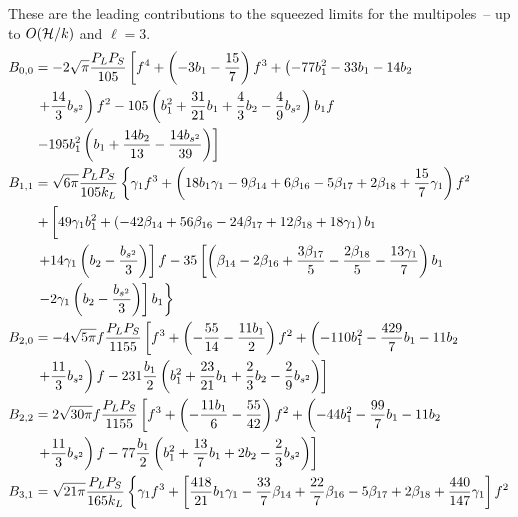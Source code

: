 These are the leading contributions to the squeezed limits for the multipoles~-- up to $O(\mathcal{H}/k)$ and \(\ell = 3\).
\begin{align}
%
B_{0,0} &= -2 \sqrt{\pi} \frac{P_L P_S}{105} \left[f^{4}+\left(-3 b_{1}-\frac{15}{7}\right) f^{3}+\left(-77 b_{1}^{2}-33 b_{1}-14 b_{2} \right. \right. \nonumber \\
&\left. \left. + \frac{14}{3} b_{s^2}\right) f^{2} -105 \left( b_{1}^{2} + \frac{31}{21} b_{1}+\frac{4}{3} b_{2} -\frac{4}{9} b_{s^2}\right) b_{1} f \right. \nonumber \\
&\left. - 195 b_{1}^{2}\left(b_{1}+\frac{14 b_{2}}{13}-\frac{14 b_{s^2}}{39}\right)\right]\\
%
%
%
B_{1,1} &= \sqrt{6 \pi} \frac{P_L P_S}{105 k_{L}} \left\{ \gamma_1 f^{3}+\left(18 b_{1} \gamma_1-9 \beta_{14}+6 \beta_{16}-5 \beta_{17}+2 \beta_{18}+\frac{15}{7} \gamma_1\right) f^{2}\right. \nonumber \\
&\left. +\left[ \vphantom{\frac{\gamma^2}{3}} 49 \gamma_1 b_{1}^{2}+\left(-42 \beta_{14} +56 \beta_{16}-24 \beta_{17}+12 \beta_{18}+18 \gamma_1\right) b_{1} \right. \right. \nonumber \\
&\left. \left. + 14 \gamma_1\left(b_{2}-\frac{b_{s^2}}{3}\right)\right] f -35\left[\left(\beta_{14}-2 \beta_{16}+\frac{3 \beta_{17}}{5}-\frac{2 \beta_{18}}{5}-\frac{13 \gamma_1}{7}\right) b_{1} \right. \right. \nonumber \\
&\left. \left. - 2 \gamma_1\left(b_{2}-\frac{b_{s^2}}{3}\right)  \right] b_{1}\right\} \\
%
%
%
B_{2,0} &= - 4 \sqrt{5 \pi}  f \frac{P_L P_S}{1155} \left[f^{3}+\left(-\frac{55}{14}-\frac{11 b_{1}}{2}\right) f^{2}+\left(-110 b_{1}^{2}-\frac{429}{7} b_{1}-11 b_{2} \right. \right. \nonumber \\
&\left. \left. +\frac{11}{3} b_{s^2}\right) f - 231 \frac{b_1}{2} \left(b_{1}^{2}+\frac{23}{21} b_{1}+\frac{2}{3} b_{2}-\frac{2}{9} b_{s^2}\right)  \right]\\
%
%
%
B_{2,2} &= 2 \sqrt{30 \pi} f  \frac{P_L P_S}{1155} \left[f^{3}+\left(-\frac{11 b_{1}}{6}-\frac{55}{42}\right) f^{2}+\left(-44 b_{1}^{2}-\frac{99}{7} b_{1}-11 b_{2} \right. \right. \nonumber \\
&\left. \left. + \frac{11}{3} b_{s^2}\right) f - 77 \frac{b_1}{2} \left(b_{1}^{2}+\frac{13}{7} b_{1}+2 b_{2}-\frac{2}{3} b_{s^2}\right) \right] \\
%
%
B_{3,1}&=\sqrt{21 \pi }\frac{P_L P_S}{165 k_{L}}   \left\{  \gamma_1 f^{3} +\left[\frac{418}{21} b_{1} \gamma_1-\frac{33}{7} \beta_{14}+\frac{22}{7} \beta_{16}-5 \beta_{17}+2 \beta_{18}+\frac{440}{147} \gamma_1\right] f^{2} \right. \nonumber \\

\end{align}
